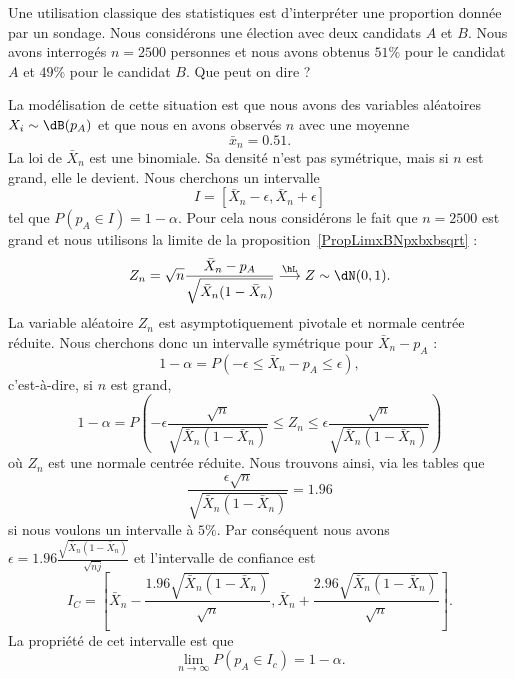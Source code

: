 Une utilisation classique des statistiques est d'interpréter une proportion donnée par un sondage. Nous considérons une élection avec deux candidats \( A\) et \( B\). Nous avons interrogés \( n=2500\) personnes et nous avons obtenus \( 51\%\) pour le candidat \( A\) et \( 49\%\) pour le candidat \( B\). Que peut on dire ?

La modélisation de cette situation est que nous avons des variables aléatoires \( X_i\sim\dB(p_A)\) et que nous en avons observés \( n\) avec une moyenne
\begin{equation}
    \bar x_n=0.51.
\end{equation}
La loi de \( \bar X_n\) est une binomiale. Sa densité n'est pas symétrique, mais si \( n\) est grand, elle le devient. Nous cherchons un intervalle
\begin{equation}
    I=[\bar X_n-\epsilon,\bar X_n+\epsilon]
\end{equation}
tel que \( P(p_A\in I)=1-\alpha\). Pour cela nous considérons le fait que \( n=2500\) est grand et nous utilisons la limite de la proposition~\ref{PropLimxBNpxbxbsqrt} :
\begin{equation}
    Z_n=\sqrt{n}\frac{ \bar X_n-p_A }{ \sqrt{\bar X_n(1-\bar X_n)} }\stackrel{\hL}{\longrightarrow}Z\sim\dN(0,1).
\end{equation}
La variable aléatoire \( Z_n\) est asymptotiquement pivotale et normale centrée réduite. Nous cherchons donc un intervalle symétrique pour \( \bar X_n-p_A\) :
\begin{equation}
    1-\alpha=P(-\epsilon\leq \bar X_n-p_A\leq \epsilon),
\end{equation}
c'est-à-dire, si \( n\) est grand,
\begin{equation}
    1-\alpha=P\left( -\epsilon\frac{ \sqrt{n} }{ \sqrt{\bar X_n(1-\bar X_n)} }\leq Z_n\leq\epsilon\frac{ \sqrt{n} }{ \sqrt{\bar X_n(1-\bar X_n)} } \right)
\end{equation}
où \( Z_n\) est une normale centrée réduite. Nous trouvons ainsi, via les tables que
\begin{equation}
    \frac{ \epsilon\sqrt{n} }{ \sqrt{\bar X_n(1-\bar X_n)} }=1.96
\end{equation}
si nous voulons un intervalle à \( 5\%\). Par conséquent nous avons \( \epsilon=1.96\frac{ \sqrt{\bar X_n(1-\bar X_n)} }{ \sqrt{nj} }\) et l'intervalle de confiance est
\begin{equation}
    I_C=\left[ \bar X_n-\frac{ 1.96\sqrt{\bar X_n(1-\bar X_n)} }{ \sqrt{n} },\bar X_n+\frac{ 2.96\sqrt{\bar X_n(1-\bar X_n)} }{ \sqrt{n} } \right].
\end{equation}
La propriété de cet intervalle est que
\begin{equation}
    \lim_{n\to \infty} P(p_A\in I_c)=1-\alpha.
\end{equation}

